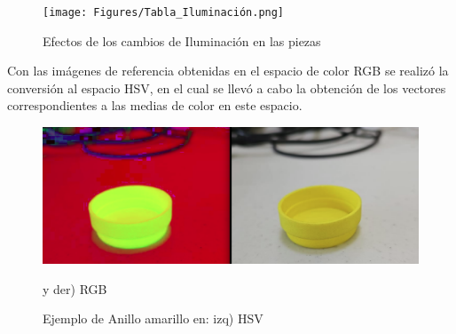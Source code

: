 \begin{figure}[ht]
\centering
\texttt{[image: Figures/Tabla\_Iluminación.png]}
    \caption{Efectos de los cambios de Iluminación en las piezas}
    \label{fig:Ilumination}
\end{figure}

Con las imágenes de referencia obtenidas en el espacio de color RGB se realizó la conversión al espacio HSV, en el cual se llevó a cabo la obtención de los vectores correspondientes a las medias de color en este espacio.

\begin{figure}[ht]
\centering
\includegraphics[scale= 0.3]{Figures/HSV_YellowRing.png}
    \caption{Ejemplo de Anillo amarillo en: izq) HSV} y der) RGB
    \label{fig:YellowRing_HSV}
\end{figure}

